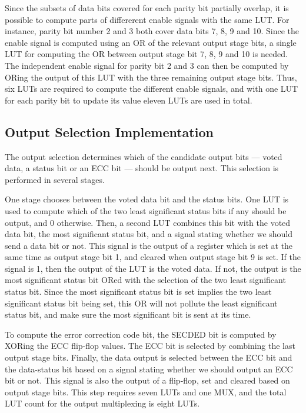 Since the subsets of data bits covered for each parity bit partially
overlap, it is possible to compute parts of differerent enable signals
with the same LUT. For instance, parity bit number 2 and 3 both cover
data bits 7, 8, 9 and 10. Since the enable signal is computed using an
OR of the relevant output stage bits, a single LUT for computing the
OR between output stage bit 7, 8, 9 and 10 is needed. The independent
enable signal for parity bit 2 and 3 can then be computed by ORing the
output of this LUT with the three remaining output stage bits. Thus,
six LUTs are required to compute the different enable signals, and
with one LUT for each parity bit to update its value eleven LUTs are
used in total.

\subsection{Output Selection Implementation}
The output selection determines which of the candidate output bits ---
voted data, a status bit or an ECC bit --- should be output next. This
selection is performed in several stages. 

One stage chooses between the voted data bit and the status bits. One
LUT is used to compute which of the two least significant status bits
if any should be output, and 0 otherwise. Then, a second LUT combines
this bit with the voted data bit, the most significant status bit, and
a signal stating whether we should send a data bit or not. This signal
is the output of a register which is set at the same time as output
stage bit 1, and cleared when output stage bit 9 is set. If the signal
is 1, then the output of the LUT is the voted data. If not, the output
is the most significant status bit ORed with the selection of the two
least significant status bit. Since the most significant status bit is
set implies the two least significant status bit being set, this OR
will not pollute the least significant status bit, and make sure the
most significant bit is sent at its time.

To compute the error correction code bit, the SECDED bit is computed
by XORing the ECC flip-flop values. The ECC bit is selected by
combining the last output stage bits. Finally, the data output is
selected between the ECC bit and the data-status bit based on a signal
stating whether we should output an ECC bit or not. This signal is
also the output of a flip-flop, set and cleared based on output stage
bits. This step requires seven LUTs and one MUX, and the total LUT
count for the output multiplexing is eight LUTs.

